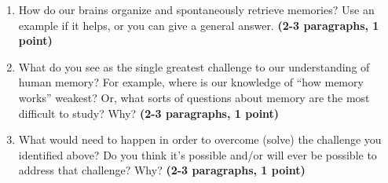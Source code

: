 \documentclass[11pt]{article}
\begin{document}
\begin{enumerate}
\item How do our brains organize and spontaneously retrieve memories?
  Use an example if it helps, or you can give a general answer.
  \textbf{(2-3 paragraphs, 1 point)}

\item What do you see as the single greatest challenge to our understanding
  of human memory?  For example, where is our knowledge of ``how
  memory works'' weakest?  Or, what sorts of questions about memory are
  the most difficult to study?  Why?  \textbf{(2-3 paragraphs, 1 point)}

\item What would need to happen in order to overcome (solve) the challenge you
  identified above?  Do you think it's possible and/or will ever be
  possible to address that challenge?  Why?  \textbf{(2-3 paragraphs, 1 point)}
\end{enumerate}
\end{document}
